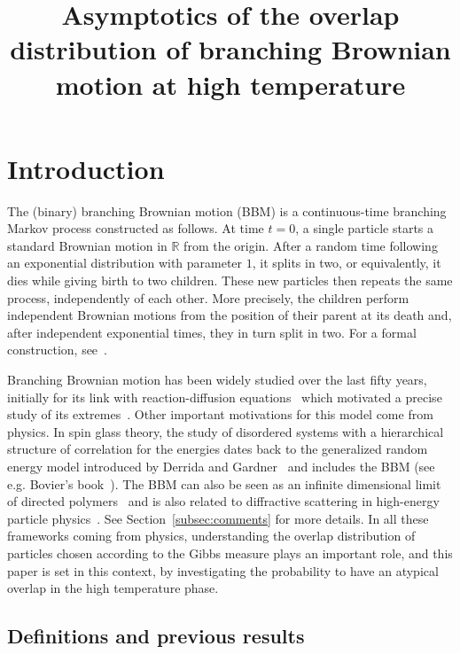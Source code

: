 \documentclass[AHL,Unicode,longabstracts,published]{cedram}
\title[Asymptotics of the overlap distribution of BBM at high temperature]{Asymptotics of the overlap distribution of branching Brownian motion at high temperature}
\author[\initial{L.} \lastname{Chataignier}]{\firstname{Louis} \lastname{Chataignier}}
\author[\initial{M.} \lastname{Pain}]{\firstname{Michel} \lastname{Pain}}
\newcommand{\R}{\mathbb{R}}
\newcommand\1{\mathds{1}}
\begin{document}
\maketitle

\tableofcontents

\section{Introduction}

The (binary) branching Brownian motion (BBM) is a continuous-time branching Markov process constructed as follows. At time $t = 0$, a single particle starts a standard Brownian motion in $\R$ from the origin. After a random time following an exponential distribution with parameter $1$, it splits in two, or equivalently, it dies while giving birth to two children. These new particles then repeats the same process, independently of each other. More precisely, the children perform independent Brownian motions from the position of their parent at its death and, after independent exponential times, they in turn split in two. For a formal construction, see~\cite{Chauvin1991}.

Branching Brownian motion has been widely studied over the last fifty years, initially for its link with reaction-diffusion equations~\cite{McKean1975} which motivated a precise study of its extremes~\cite{AidekonBerestyckiBrunetShi2013,ArguinBovierKistler2013,Bramson1978,Bramson1983,LalleySellke1987}. Other important motivations for this model come from physics. In spin glass theory, the study of disordered systems with a hierarchical structure of correlation for the energies dates back to the generalized random energy model introduced by Derrida and Gardner~\cite{DerridaGardner1986} and includes the BBM (see e.g. Bovier's book~\cite{Bovier2016}). The BBM can also be seen as an infinite dimensional limit of directed polymers~\cite{DerridaSpohn1988} and is also related to diffractive scattering in high-energy particle physics~\cite{Munier2009}. See Section~\ref{subsec:comments} for more details. In all these frameworks coming from physics, understanding the overlap distribution of particles chosen according to the Gibbs measure plays an important role, and this paper is set in this context, by investigating the probability to have an atypical overlap in the high temperature phase.

\subsection{Definitions and previous results}
\end{document}
